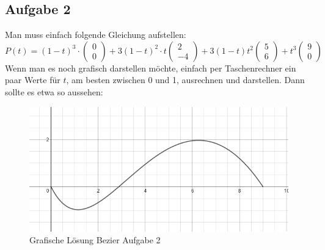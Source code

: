 \subsection{Aufgabe 2}
Man muss einfach folgende Gleichung aufstellen:
\begin{displaymath}
P\left( t\right) = \left( 1-t\right)^3 \cdot \begin{pmatrix}0 \\ 0\end{pmatrix} + 3\left( 1-t\right)^2\cdot t \begin{pmatrix}2 \\ -4\end{pmatrix} + 3\left( 1-t\right)t^2\begin{pmatrix}5 \\ 6\end{pmatrix} + t^3\begin{pmatrix}9 \\ 0\end{pmatrix}
\end{displaymath}
Wenn man es noch grafisch darstellen möchte, einfach per Taschenrechner ein paar Werte für \(t\), am besten zwischen 0 und 1, ausrechnen und darstellen. Dann sollte es etwa so aussehen:
\begin{figure}[!ht]
	\centering
	\includegraphics[width=0.5\linewidth]{fig/bezier_aufgabe2}
	\caption{Grafische Lösung Bezier Aufgabe 2}
	\label{fig:bezier_aufgabe2}
\end{figure}

